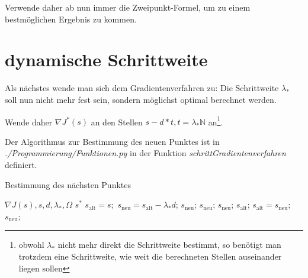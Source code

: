 \documentclass[a4paper,12pt]{report}
\newcommand{\N}{\mathbb N}
\newcommand{\1}{\mathds{1}}
\theoremstyle{plain} %
\theoremstyle{definition} %
\theoremstyle{remark}
\begin{document}
            Verwende daher ab nun immer die Zweipunkt-Formel, um zu einem bestmöglichen Ergebnis zu kommen.

      \section{dynamische Schrittweite}
            Als nächstes wende man sich dem Gradientenverfahren zu:
            Die Schrittweite $\lambda_*$ soll nun nicht mehr fest sein, sondern möglichst optimal berechnet werden.

            Wende daher $\nabla J^*(s)$ an den Stellen $s-d*t, t=\lambda_*\N$ an\footnote{obwohl $\lambda_*$ nicht mehr direkt die Schrittweite bestimmt,
            so benötigt man trotzdem eine Schrittweite, wie weit die berechneten Stellen auseinander liegen sollen}.

            Der Algorithmus zur Bestimmung des neuen Punktes ist in \textit{./Programmierung/Funktionen.py} in der Funktion \textit{schrittGradientenverfahren} definiert.
            \begin{algorithm}[h!t]
                  \caption{Bestimmung des nächsten Punktes}
                  \label{alg: dynamischerPunkt}

                  \begin{algorithmic}
                        \Require $\nabla J(s), s, d, \lambda_*, \Omega$
                        \Ensure $s^*$
                        \State $s_{\text{alt}} = s;$
                              \State $s_{\text{neu}} = s_{\text{alt}}-\lambda_* d$;
                                    \State\Return $s_{\text{neu}}$;
                                    \State\Return $s_{\text{neu}}$;
                                          \State\Return $s_{\text{neu}}$;
                                    \Else
                                          \State\Return $s_{\text{alt}}$;
                                    \EndIf
                              \EndIf
                              \State $s_{\text{alt}} = s_{\text{neu}}$;
                        \EndFor
                  \State\Return $s_{\text{neu}};$
                  \end{algorithmic}
            \end{algorithm}
\end{document}
